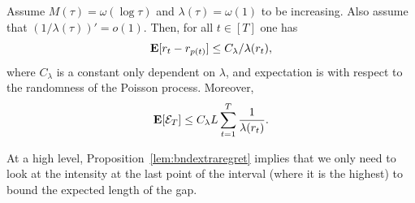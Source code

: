 \begin{proposition}\label{lem:bndextraregret}
    Assume $M(\tau) = \omega(\log \tau)$ and $\lambda(\tau) = \omega(1)$ to be increasing. Also assume that $(1/\lambda(\tau))' = o(1)$. Then, for all $t \in [T]$ one has
    \[
        \mathbf{E}[r_t - r_{p(t)}] \leq C_\lambda/\lambda(r_t),
    \]
    where $C_\lambda$ is a constant only dependent on $\lambda$, and expectation is with respect to the randomness of the Poisson process. Moreover,
    \[
         \mathbf{E}[\mathcal{E}_T] \leq C_\lambda L\sum_{t=1}^T \frac{1}{\lambda(r_t)}.
    \]
\end{proposition}

At a high level, Proposition~\ref{lem:bndextraregret} implies that we only need to look at the intensity at the last point of the interval (where it is the highest) to bound the expected length of the gap.  

